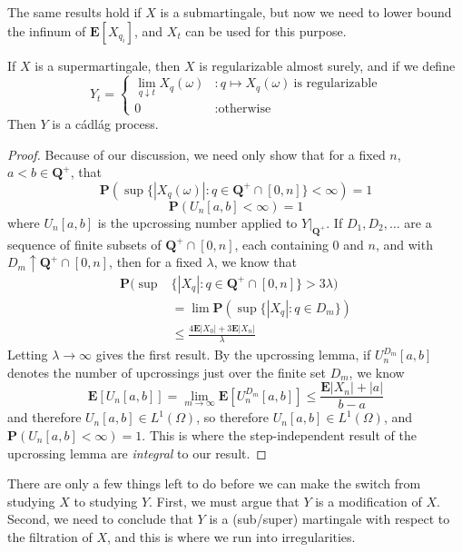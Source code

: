 The same results hold if $X$ is a submartingale, but now we need to lower bound the infinum of $\mathbf{E}[X_{q_i}]$, and $X_t$ can be used for this purpose.

\begin{theorem}
    If $X$ is a supermartingale, then $X$ is regularizable almost surely, and if we define
    \[ Y_t = \begin{cases} \lim_{q \downarrow t} X_q(\omega) & : q \mapsto X_q(\omega)\ \text{is regularizable} \\ 0 & : \text{otherwise} \end{cases} \]
    Then $Y$ is a c\'{a}dl\'{a}g process.
\end{theorem}
\begin{proof}
    Because of our discussion, we need only show that for a fixed $n$, $a < b \in \mathbf{Q}^+$, that
    \[ \mathbf{P}(\sup \{ |X_q(\omega)|: q \in \mathbf{Q}^+ \cap [0,n] \} < \infty) = 1 \]
    \[ \mathbf{P}(U_n[a,b] < \infty) = 1 \]
    where $U_n[a,b]$ is the upcrossing number applied to $Y|_{\mathbf{Q}^+}$. If $D_1, D_2, \dots$ are a sequence of finite subsets of $\mathbf{Q}^+ \cap [0,n]$, each containing $0$ and $n$, and with $D_m \uparrow \mathbf{Q}^+ \cap [0,n]$, then for a fixed $\lambda$, we know that
    \begin{align*}
        \mathbf{P}(\sup & \{ |X_q|: q \in \mathbf{Q}^+ \cap [0,n] \} > 3 \lambda)\\
        &= \lim \mathbf{P}(\sup \{ |X_q|: q \in D_m \})\\
        &\leq \frac{4 \mathbf{E} |X_0| + 3 \mathbf{E} |X_n|}{\lambda}
    \end{align*}
    Letting $\lambda \to \infty$ gives the first result. By the upcrossing lemma, if $U^{D_m}_n[a,b]$ denotes the number of upcrossings just over the finite set $D_m$, we know
    \[ \mathbf{E}[U_n[a,b]] = \lim_{m \to \infty} \mathbf{E}[U^{D_m}_n[a,b]] \leq \frac{\mathbf{E} |X_n| + |a|}{b-a} \]
    and therefore $U_n[a,b] \in L^1(\Omega)$, so therefore $U_n[a,b] \in L^1(\Omega)$, and $\mathbf{P}(U_n[a,b] < \infty) = 1$. This is where the step-independent result of the upcrossing lemma are {\it integral} to our result.
\end{proof}

There are only a few things left to do before we can make the switch from studying $X$ to studying $Y$. First, we must argue that $Y$ is a modification of $X$. Second, we need to conclude that $Y$ is a (sub/super) martingale with respect to the filtration of $X$, and this is where we run into irregularities.

